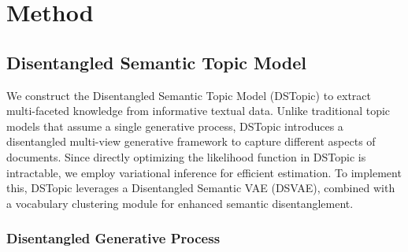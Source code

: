 
\chapter{Method} %

\label{ChapterX} %


\section{Disentangled Semantic Topic Model}

We construct the Disentangled Semantic Topic Model (DSTopic) to extract multi-faceted knowledge from informative textual data. Unlike traditional topic models that assume a single generative process, DSTopic introduces a disentangled multi-view generative framework to capture different aspects of documents. Since directly optimizing the likelihood function in DSTopic is intractable, we employ variational inference for efficient estimation. To implement this, DSTopic leverages a Disentangled Semantic VAE (DSVAE), combined with a vocabulary clustering module for enhanced semantic disentanglement. 


\subsection{Disentangled Generative Process}
\label{chapter:generation}

